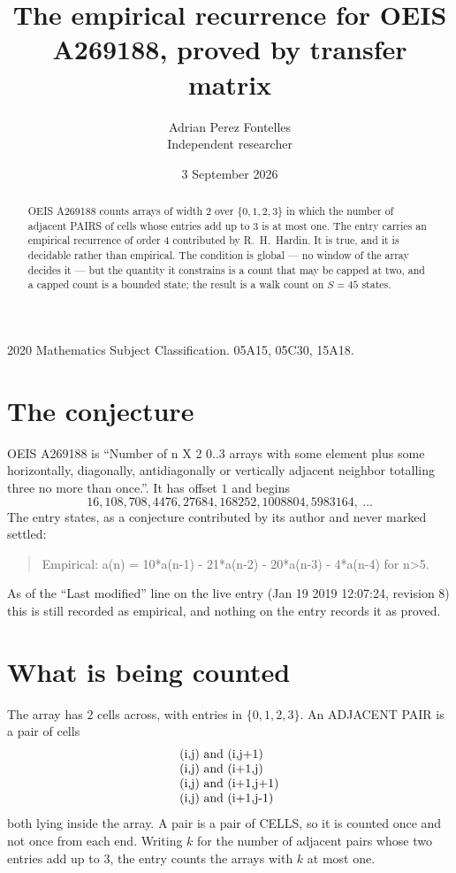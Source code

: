 \documentclass[11pt,a4paper]{article}
\title{The empirical recurrence for OEIS A269188, proved by transfer matrix}
\author{Adrian Perez Fontelles\\ \small Independent researcher}
\date{3 September 2026}
\theoremstyle{plain}
\theoremstyle{definition}
\begin{document}
\maketitle

\begin{abstract}
OEIS A269188 counts arrays of width $2$ over $\{0,1,2,3\}$ in which the number of adjacent PAIRS of
cells whose entries add up to $3$ is at most one. The entry carries an empirical recurrence of
order $4$ contributed by R.~H.~Hardin. It is true, and it is decidable rather than
empirical. The condition is global --- no window of the array decides it --- but the quantity
it constrains is a count that may be capped at two, and a capped count is a bounded state; the
result is a walk count on $S=45$ states.
\end{abstract}

\noindent\small 2020 Mathematics Subject Classification. 05A15, 05C30, 15A18.\normalsize

\section{The conjecture}

OEIS A269188 is ``Number of n X 2 0..3 arrays with some element plus some horizontally, diagonally, antidiagonally or vertically adjacent neighbor totalling three no more than once.''. It has offset $1$ and begins
\[
16, 108, 708, 4476, 27684, 168252, 1008804, 5983164,\ \dots
\]
The entry states, as a conjecture contributed by its author and never marked settled:
\begin{quote}
Empirical: a(n) = 10*a(n-1) - 21*a(n-2) - 20*a(n-3) - 4*a(n-4) for n>5.
\end{quote}
As of the ``Last modified'' line on the live entry (Jan 19 2019 12:07:24, revision 8) this is still
recorded as empirical, and nothing on the entry records it as proved.

\section{What is being counted}

The array has $2$ cells across, with entries in $\{0,1,2,3\}$. An ADJACENT PAIR is a pair of cells
\[
\begin{array}{l}
$(i,j)\text{ and }(i,j{+}1)$ \\
$(i,j)\text{ and }(i{+}1,j)$ \\
$(i,j)\text{ and }(i{+}1,j{+}1)$ \\
$(i,j)\text{ and }(i{+}1,j{-}1)$ \\
\end{array}
\]
both lying inside the array. A pair is a pair of CELLS, so it is counted once and not once from
each end. Writing $k$ for the number of adjacent pairs whose two entries add up to $3$, the
entry counts the arrays with $k$ at most one.
\end{document}
